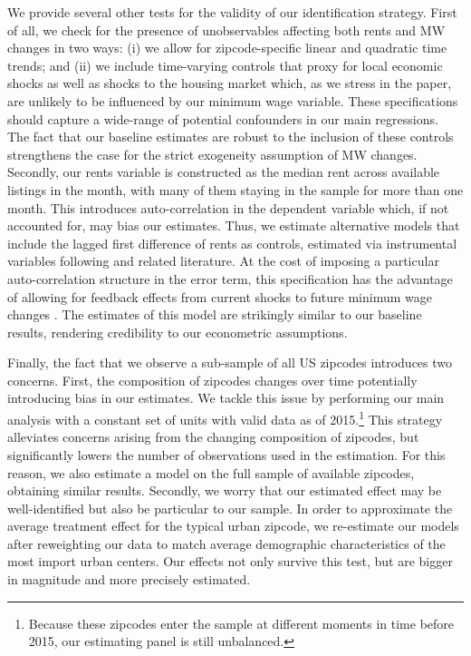 We provide several other tests for the validity of our identification strategy. First of all, 
we check for the presence of unobservables affecting both rents and MW changes in two ways: 
(i) we allow for zipcode-specific linear and quadratic time trends; and (ii) we include 
time-varying controls that proxy for local economic shocks as well as shocks to the housing 
market which, as we stress in the paper, are unlikely to be influenced by our minimum wage 
variable.
These specifications should capture a wide-range of potential confounders in our main 
regressions. The fact that our baseline estimates are robust to the inclusion of these 
controls strengthens the case for the strict exogeneity assumption of MW changes. Secondly, 
our rents variable is constructed as the median rent across available listings in the month, 
with many of them staying in the sample for more than one month. This introduces 
auto-correlation in the dependent variable which, if not accounted for, may bias our estimates. 
Thus, we estimate alternative models that include the lagged first difference of rents as 
controls, estimated via instrumental variables following \textcite{ArellanoBond1991} and 
related literature. At the cost of imposing a particular auto-correlation structure in the 
error term, this specification has the advantage of allowing for feedback effects from current 
shocks to future minimum wage changes \parencite{ArellanoHonore2001}. The estimates of this 
model are strikingly similar to our baseline results, rendering credibility to our econometric 
assumptions.

Finally, the fact that we observe a sub-sample of all US zipcodes introduces two concerns. 
First, the composition of zipcodes changes over time potentially introducing bias in our 
estimates. We tackle this issue by performing our main analysis with a constant set of units 
with valid data as of 2015.\footnote{Because these zipcodes enter the sample at different 
	moments in time before 2015, our estimating panel is still unbalanced.} 
This strategy alleviates concerns arising from the changing composition of zipcodes, but 
significantly lowers the number of observations used in the estimation. For this reason, we 
also estimate a model on the full sample of available zipcodes, obtaining similar results. 
Secondly, we worry that our estimated effect may be well-identified but also be particular 
to our sample. In order to approximate the average treatment effect for the typical urban 
zipcode, we re-estimate our models after reweighting our data to match average demographic 
characteristics of the most import urban centers. Our effects not only survive this test, but 
are bigger in magnitude and more precisely estimated.

